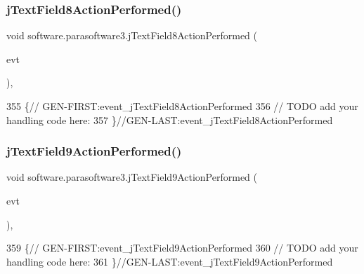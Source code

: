 \subsubsection{\texorpdfstring{j\+Text\+Field8\+Action\+Performed()}{jTextField8ActionPerformed()}}
{\footnotesize\ttfamily void software.\+parasoftware3.\+j\+Text\+Field8\+Action\+Performed (\begin{DoxyParamCaption}\item[{java.\+awt.\+event.\+Action\+Event}]{evt }\end{DoxyParamCaption})\hspace{0.3cm}{\ttfamily [inline]}, {\ttfamily [private]}}


\begin{DoxyCode}
355                                                                             \{\textcolor{comment}{//
      GEN-FIRST:event\_jTextField8ActionPerformed}
356         \textcolor{comment}{// TODO add your handling code here:}
357     \}\textcolor{comment}{//GEN-LAST:event\_jTextField8ActionPerformed}
\end{DoxyCode}
\mbox{\label{classsoftware_1_1parasoftware3_a40195e49c216f9f4f41678240d0ffc1a}} 
\subsubsection{\texorpdfstring{j\+Text\+Field9\+Action\+Performed()}{jTextField9ActionPerformed()}}
{\footnotesize\ttfamily void software.\+parasoftware3.\+j\+Text\+Field9\+Action\+Performed (\begin{DoxyParamCaption}\item[{java.\+awt.\+event.\+Action\+Event}]{evt }\end{DoxyParamCaption})\hspace{0.3cm}{\ttfamily [inline]}, {\ttfamily [private]}}


\begin{DoxyCode}
359                                                                             \{\textcolor{comment}{//
      GEN-FIRST:event\_jTextField9ActionPerformed}
360         \textcolor{comment}{// TODO add your handling code here:}
361     \}\textcolor{comment}{//GEN-LAST:event\_jTextField9ActionPerformed}
\end{DoxyCode}
\mbox{\label{classsoftware_1_1parasoftware3_a20a8c78671c3a423b115b4fd4e565ce1}} 
